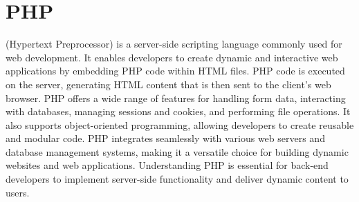 \chapter{PHP}
\thispagestyle{fancy}
\lstset{language=php, style=phpstyle}

 (Hypertext Preprocessor) is a server-side scripting language commonly used for web development. It enables developers to create dynamic and interactive web applications by embedding PHP code within HTML files. PHP code is executed on the server, generating HTML content that is then sent to the client's web browser. PHP offers a wide range of features for handling form data, interacting with databases, managing sessions and cookies, and performing file operations. It also supports object-oriented programming, allowing developers to create reusable and modular code. PHP integrates seamlessly with various web servers and database management systems, making it a versatile choice for building dynamic websites and web applications. Understanding PHP is essential for back-end developers to implement server-side functionality and deliver dynamic content to users.